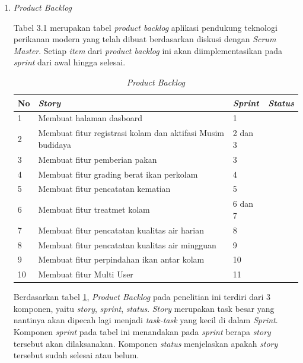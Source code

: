 \begin{enumerate}
\setlength{\enumerateparindent}{2em}
	\item{\textit{Product Backlog}}
	
	\hspace{\enumerateparindent} Tabel 3.1 merupakan tabel \textit{product backlog} aplikasi pendukung teknologi perikanan modern yang telah dibuat berdasarkan diskusi dengan \textit{Scrum Master}. Setiap \textit{item} dari \textit{product backlog} ini akan diimplementasikan pada \textit{sprint} dari awal hingga selesai.

\begin{table}[H]
	\caption{\textit{Product Backlog}}
	\label{product_backlog}
	\begin{tabular}{@{} |p{0.5cm}|p{8cm}|p{1.5cm}|p{2.5cm}| @{}}
		\hline
		\textbf{No} & \textbf{\textit{Story}} & \textbf{\textit{Sprint}} & \textbf{\textit{Status}} \\
		\hline
		1 & Membuat halaman dasboard & 1 & \\
		\hline
		2 & Membuat fitur registrasi kolam dan aktifasi Musim budidaya & 2 dan 3 & \\
		\hline
		3 & Membuat fitur pemberian pakan & 3 & \\
		\hline
		4 & Membuat fitur grading berat ikan perkolam & 4 & \\
		\hline
		5 & Membuat fitur pencatatan kematian & 5 & \\
		\hline
		6 & Membuat fitur treatmet kolam & 6 dan 7 & \\
		\hline
		7 & Membuat fitur pencatatan kualitas air harian &  8  & \\
		\hline
		8 & Membuat fitur pencatatan kualitas air mingguan & 9 & \\
		\hline
		9 & Membuat fitur perpindahan ikan antar kolam & 10 & \\
		\hline
		10 & Membuat fitur Multi User & 11 & \\
		\hline
	\end{tabular}
\end{table}

	\hspace{\enumerateparindent} Berdasarkan tabel \ref{product_backlog}, \textit{Product Backlog} pada penelitian ini terdiri dari 3 komponen, yaitu \textit{story}, \textit{sprint}, \textit{status}. \textit{Story} merupakan task besar yang nantinya akan dipecah lagi menjadi \textit{task-task} yang kecil di dalam \textit{Sprint}. Komponen \textit{sprint} pada tabel ini menandakan pada \textit{sprint} berapa \textit{story} tersebut akan dilaksanakan. Komponen \textit{status} menjelaskan apakah \textit{story} tersebut sudah selesai atau belum.


\end{enumerate}
